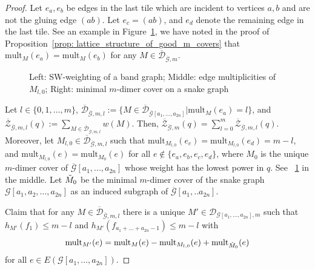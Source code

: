 \documentclass[11pt]{amsart}
\theoremstyle{definition}
\theoremstyle{remark}
\numberwithin{equation}{section}
\begin{document}
\begin{proof}
    Let $e_a,e_b$ be edges in the last tile which are incident to vertices $a,b$ and are not the gluing edge $(ab)$. Let $e_c = (ab)$, and $e_d$ denote the remaining edge in the last tile. See an example in Figure~\ref{fig:m_dimer_proof}, we have noted in the proof of Proposition~\ref{prop: lattice_structure_of_good_m_covers} that $\text{mult}_{M}(e_a) = \text{mult}_{M}(e_b)$ for any $M\in \overline{\mathcal{D}}_{\overline{\mathcal{G}},m}$.
    
    \begin{figure}[h!]
    \centering
    
    \caption{Left: SW-weighting of a band graph; Middle: edge multiplicities of $M_{l,0}$; Right: minimal $m$-dimer cover on a snake graph}
    \label{fig:m_dimer_proof}
    \end{figure}

    Let $l\in \{0,1,...,m\}$, $\overline{\mathcal{D}}_{\overline{\mathcal{G}},m,l}:=\{M\in \overline{\mathcal{D}}_{\overline{\mathcal{G}}[a_1,...,a_{2n}]} | \text{mult}_M(e_a) = l\}$, and $\overline{\mathcal{Z}}_{\overline{\mathcal{G}},m,l}(q):= \displaystyle\sum_{M\in \overline{\mathcal{D}}_{\overline{\mathcal{G}},m,l}}w(M)$. Then, $\overline{\mathcal{Z}}_{\overline{\mathcal{G}},m}(q) = \sum^m_{l=0}\overline{\mathcal{Z}}_{\overline{\mathcal{G}},m,l}(q)$. Moreover, let $M_{l,0}\in \overline{\mathcal{D}}_{\overline{\mathcal{G}},m,l}$ such that $\text{mult}_{M_{l,0}}(e_c)= \text{mult}_{M_{l,0}}(e_d) = m-l$, and $\text{mult}_{M_{l,0}}(e) = \text{mult}_{M_{0}}(e)$ for all $e\notin \{e_a,e_b,e_c,e_d\}$, where $M_0$ is the unique $m$-dimer cover of $\overline{\mathcal{G}}[a_1,...,a_{2n}]$ whose weight has the lowest power in $q$. See ~\ref{fig:m_dimer_proof} in the middle. Let $\Tilde{M}_0$ be the minimal $m$-dimer cover of the snake graph $\mathcal{G}[a_1,a_2,...,a_{2n}]$ as an induced subgraph of $\overline{\mathcal{G}}[a_1,..a_{2n}]$.
    
    Claim that for any $M\in \overline{\mathcal{D}}_{\overline{\mathcal{G}},m,l}$ there is a unique $M'\in \mathcal{D}_{\mathcal{G}[a_1,...,a_{2n}],m}$ such that $h_{M'}(f_1)\leq m-l$ and $h_{M'}(f_{a_1+...+a_{2n}-1})\leq m-l$ with \[\text{mult}_{M'}(e) = \text{mult}_{M}(e) - \text{mult}_{M_{l,0}}(e) + \text{mult}_{\Tilde{M}_0}(e)\] for all $e\in E(\mathcal{G}[a_1,...,a_{2n}]).$


\end{proof}
\end{document}

